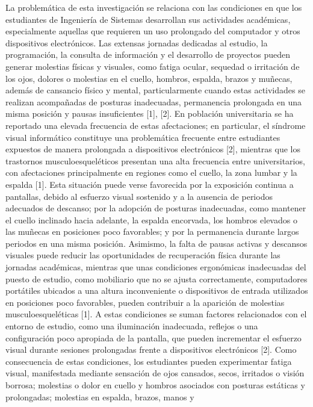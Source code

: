 La problemática de esta investigación se relaciona con las condiciones en que los
estudiantes de Ingeniería de Sistemas desarrollan sus actividades académicas,
especialmente aquellas que requieren un uso prolongado del computador y otros
dispositivos electrónicos. Las extensas jornadas dedicadas al estudio, la
programación, la consulta de información y el desarrollo de proyectos pueden generar
molestias físicas y visuales, como fatiga ocular, sequedad o irritación de los ojos,
dolores o molestias en el cuello, hombros, espalda, brazos y muñecas, además de
cansancio físico y mental, particularmente cuando estas actividades se realizan
acompañadas de posturas inadecuadas, permanencia prolongada en una misma posición y
pausas insuficientes [1], [2]. En población universitaria se ha reportado una elevada 
frecuencia de estas afectaciones; en particular, el síndrome visual informático
constituye una problemática frecuente entre estudiantes expuestos de manera
prolongada a dispositivos electrónicos [2], mientras que los trastornos
musculoesqueléticos presentan una alta frecuencia entre universitarios, con
afectaciones principalmente en regiones como el cuello, la zona lumbar y la espalda
[1]. Esta situación puede verse favorecida por la exposición continua a pantallas,
debido al esfuerzo visual sostenido y a la ausencia de periodos adecuados de
descanso; por la adopción de posturas inadecuadas, como mantener el cuello inclinado
hacia adelante, la espalda encorvada, los hombros elevados o las muñecas en
posiciones poco favorables; y por la permanencia durante largos periodos en una
misma posición. Asimismo, la falta de pausas activas y descansos visuales puede
reducir las oportunidades de recuperación física durante las jornadas académicas,
mientras que unas condiciones ergonómicas inadecuadas del puesto de estudio, como
mobiliario que no se ajusta correctamente, computadores portátiles ubicados a una
altura inconveniente o dispositivos de entrada utilizados en posiciones poco
favorables, pueden contribuir a la aparición de molestias musculoesqueléticas [1]. A
estas condiciones se suman factores relacionados con el entorno de estudio, como una
iluminación inadecuada, reflejos o una configuración poco apropiada de la pantalla,
que pueden incrementar el esfuerzo visual durante sesiones prolongadas frente a
dispositivos electrónicos [2]. Como consecuencia de estas condiciones, los
estudiantes pueden experimentar fatiga visual, manifestada mediante sensación de ojos
cansados, secos, irritados o visión borrosa; molestias o dolor en cuello y hombros
asociados con posturas estáticas y prolongadas; molestias en espalda, brazos, manos y
